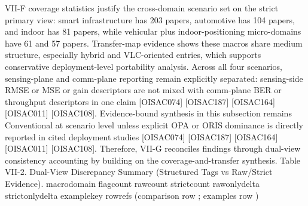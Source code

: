 {}\markdownRendererInterblockSeparator
{}\markdownRendererUlBeginTight
\markdownRendererUlItem VII-F coverage statistics justify the cross-domain scenario set on the strict primary view: smart infrastructure has 203 papers, automotive has 104 papers, and indoor has 81 papers, while vehicular plus indoor-positioning micro-domains have 61 and 57 papers.\markdownRendererUlItemEnd 
\markdownRendererUlItem Transfer-map evidence shows these macros share medium structure, especially hybrid and VLC-oriented entries, which supports conservative deployment-level portability analysis.\markdownRendererUlItemEnd 
\markdownRendererUlItem Across all four scenarios, sensing-plane and comm-plane reporting remain explicitly separated: sensing-side RMSE or MSE or gain descriptors are not mixed with comm-plane BER or throughput descriptors in one claim [O\markdownRendererUnderscore{}ISAC\markdownRendererUnderscore{}074] [O\markdownRendererUnderscore{}ISAC\markdownRendererUnderscore{}187] [O\markdownRendererUnderscore{}ISAC\markdownRendererUnderscore{}164] [O\markdownRendererUnderscore{}ISAC\markdownRendererUnderscore{}011] [O\markdownRendererUnderscore{}ISAC\markdownRendererUnderscore{}108].\markdownRendererUlItemEnd 
\markdownRendererUlItem Evidence-bound synthesis in this subsection remains Conventional at scenario level unless explicit OPA or ORIS dominance is directly reported in cited deployment studies [O\markdownRendererUnderscore{}ISAC\markdownRendererUnderscore{}074] [O\markdownRendererUnderscore{}ISAC\markdownRendererUnderscore{}187] [O\markdownRendererUnderscore{}ISAC\markdownRendererUnderscore{}164] [O\markdownRendererUnderscore{}ISAC\markdownRendererUnderscore{}011] [O\markdownRendererUnderscore{}ISAC\markdownRendererUnderscore{}108].\markdownRendererUlItemEnd 
\markdownRendererUlEndTight \markdownRendererInterblockSeparator
{}Therefore, VII-G reconciles findings through dual-view consistency accounting by building on the coverage-and-transfer synthesis.\markdownRendererInterblockSeparator
{}
\markdownRendererSectionEnd 
\markdownRendererSectionEnd \markdownRendererSectionBegin
{}\markdownRendererInterblockSeparator
{}Table VII-2. Dual-View Discrepancy Summary (Structured Tags vs Raw/Strict Evidence).\markdownRendererParagraphSeparator
{}\markdownRendererPipe{} macro\markdownRendererUnderscore{}domain \markdownRendererPipe{} flag\markdownRendererUnderscore{}count \markdownRendererPipe{} raw\markdownRendererUnderscore{}count \markdownRendererPipe{} strict\markdownRendererUnderscore{}count \markdownRendererPipe{} raw\markdownRendererUnderscore{}only\markdownRendererUnderscore{}delta \markdownRendererPipe{} strict\markdownRendererUnderscore{}only\markdownRendererUnderscore{}delta \markdownRendererPipe{} example\markdownRendererUnderscore{}key \markdownRendererPipe{} row\markdownRendererUnderscore{}refs (comparison row \markdownRendererHash{}; examples row \markdownRendererHash{}) \markdownRendererPipe{}\markdownRendererSoftLineBreak
